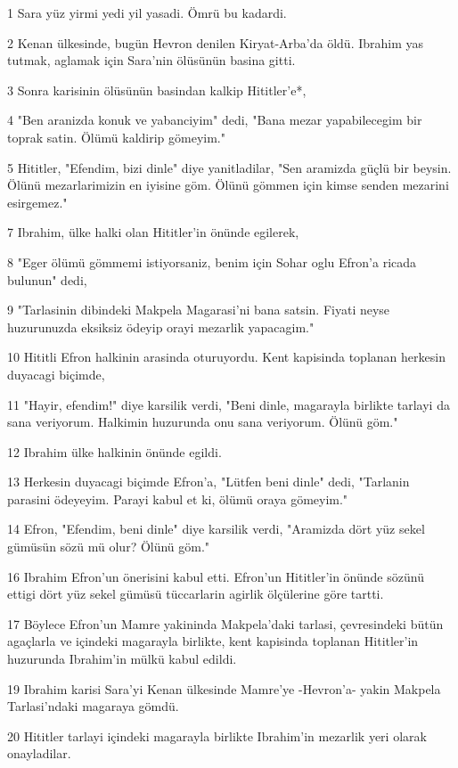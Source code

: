 \par 1 Sara yüz yirmi yedi yil yasadi. Ömrü bu kadardi.
\par 2 Kenan ülkesinde, bugün Hevron denilen Kiryat-Arba'da öldü. Ibrahim yas tutmak, aglamak için Sara'nin ölüsünün basina gitti.
\par 3 Sonra karisinin ölüsünün basindan kalkip Hititler'e*,
\par 4 "Ben aranizda konuk ve yabanciyim" dedi, "Bana mezar yapabilecegim bir toprak satin. Ölümü kaldirip gömeyim."
\par 5 Hititler, "Efendim, bizi dinle" diye yanitladilar, "Sen aramizda güçlü bir beysin. Ölünü mezarlarimizin en iyisine göm. Ölünü gömmen için kimse senden mezarini esirgemez."
\par 7 Ibrahim, ülke halki olan Hititler'in önünde egilerek,
\par 8 "Eger ölümü gömmemi istiyorsaniz, benim için Sohar oglu Efron'a ricada bulunun" dedi,
\par 9 "Tarlasinin dibindeki Makpela Magarasi'ni bana satsin. Fiyati neyse huzurunuzda eksiksiz ödeyip orayi mezarlik yapacagim."
\par 10 Hititli Efron halkinin arasinda oturuyordu. Kent kapisinda toplanan herkesin duyacagi biçimde,
\par 11 "Hayir, efendim!" diye karsilik verdi, "Beni dinle, magarayla birlikte tarlayi da sana veriyorum. Halkimin huzurunda onu sana veriyorum. Ölünü göm."
\par 12 Ibrahim ülke halkinin önünde egildi.
\par 13 Herkesin duyacagi biçimde Efron'a, "Lütfen beni dinle" dedi, "Tarlanin parasini ödeyeyim. Parayi kabul et ki, ölümü oraya gömeyim."
\par 14 Efron, "Efendim, beni dinle" diye karsilik verdi, "Aramizda dört yüz sekel gümüsün sözü mü olur? Ölünü göm."
\par 16 Ibrahim Efron'un önerisini kabul etti. Efron'un Hititler'in önünde sözünü ettigi dört yüz sekel gümüsü tüccarlarin agirlik ölçülerine göre tartti.
\par 17 Böylece Efron'un Mamre yakininda Makpela'daki tarlasi, çevresindeki bütün agaçlarla ve içindeki magarayla birlikte, kent kapisinda toplanan Hititler'in huzurunda Ibrahim'in mülkü kabul edildi.
\par 19 Ibrahim karisi Sara'yi Kenan ülkesinde Mamre'ye -Hevron'a- yakin Makpela Tarlasi'ndaki magaraya gömdü.
\par 20 Hititler tarlayi içindeki magarayla birlikte Ibrahim'in mezarlik yeri olarak onayladilar.

